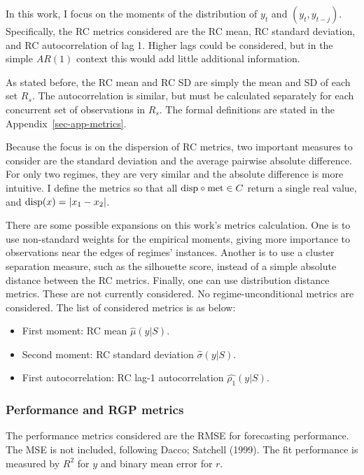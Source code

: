 \documentclass[
  letterpaper,
  DIV=11,
  numbers=noendperiod]{scrartcl}
\providecommand{\tightlist}{%
  \setlength{\itemsep}{0pt}\setlength{\parskip}{0pt}}\usepackage{longtable,booktabs,array}
\numberwithin{equation}{section}
\numberwithin{table}{section}
\numberwithin{figure}{section}
\begin{document}
In this work, I focus on the moments of the distribution of \(y_t\) and
\((y_t, y_{t-j})\). Specifically, the RC metrics considered are the RC
mean, RC standard deviation, and RC autocorrelation of lag 1. Higher
lags could be considered, but in the simple \(AR(1)\) context this would
add little additional information.

As stated before, the RC mean and RC SD are simply the mean and SD of
each set \(R_s\). The autocorrelation is similar, but must be calculated
separately for each concurrent set of observations in \(R_s\). The
formal definitions are stated in the Appendix~\ref{sec-app-metrics}.

Because the focus is on the dispersion of RC metrics, two important
measures to consider are the standard deviation and the average pairwise
absolute difference. For only two regimes, they are very similar and the
absolute difference is more intuitive. I define the metrics so that all
\(\text{disp} \circ \text{met} \in C\) return a single real value, and
\(\text{disp}(x) = |x_1 - x_2|\).

There are some possible expansions on this work's metrics calculation.
One is to use non-standard weights for the empirical moments, giving
more importance to observations near the edges of regimes' instances.
Another is to use a cluster separation measure, such as the silhouette
score, instead of a simple absolute distance between the RC metrics.
Finally, one can use distribution distance metrics. These are not
currently considered. No regime-unconditional metrics are considered.
The list of considered metrics is as below:

\begin{itemize}
\tightlist
\item
  First moment: RC mean \(\hat{\mu}(y | S)\).
\item
  Second moment: RC standard deviation \(\hat{\sigma}(y | S)\).
\item
  First autocorrelation: RC lag-1 autocorrelation
  \(\hat{\rho_1}(y | S)\).
\end{itemize}

\subsubsection{Performance and RGP
metrics}\label{performance-and-rgp-metrics}

The performance metrics considered are the RMSE for forecasting
performance. The MSE is not included, following Dacco; Satchell (1999).
The fit performance is measured by \(R^2\) for \(y\) and binary mean
error for \(r\).
\end{document}

